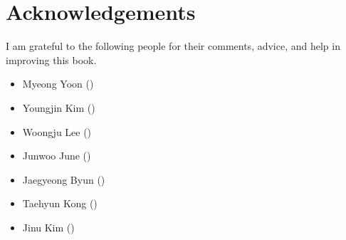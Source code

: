     \chapter*{Acknowledgements}

    I am grateful to the following people for their comments, advice, and help
    in improving this book.

    \begin{itemize}
        \item Myeong Yoon (\UniversityOfCambridge)
        \item Youngjin Kim (\YonseiUniversity)
        \item Woongju Lee (\MassachusettsInstituteOfTechnology)
        \item Junwoo June (\PohangUniversityOfScienceAndTechnology)
        \item Jaegyeong Byun (\SeoulNationalUniversity)
        \item Taehyun Kong (\KoreaUniversity)
        \item Jinu Kim (\PohangUniversityOfScienceAndTechnology)
    \end{itemize}
